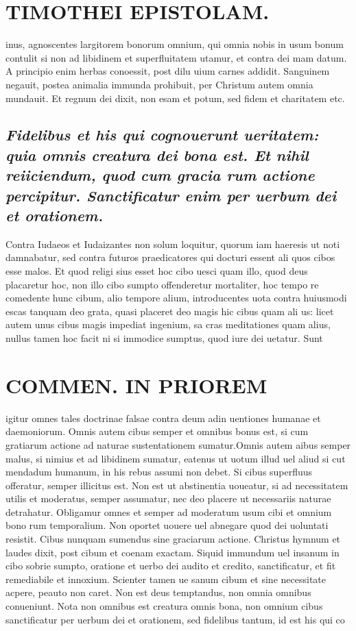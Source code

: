 \documentclass{article}
\begin{document}
\begin{pages}
\section*{TIMOTHEI EPISTOLAM. }
\marginpar{[ p.99 ]}\pstart inus, agnoscentes largitorem bonorum omnium, qui omnia nobis in usum bonum contulit si non ad libidinem et superfluitatem utamur, et contra dei mam datum. A principio enim herbas conoessit, post dilu uium carnes addidit. Sanguinem negauit, postea animalia immunda prohibuit, per Christum autem omnia mundauit. Et regnum dei dixit, non esam et potum, sed fidem et charitatem etc.  \pend
{}
{}
\subsection*{\textit{Fidelibus et his qui cognouerunt ueritatem: quia omnis creatura dei bona est. Et nihil reiiciendum, quod cum gracia rum actione percipitur. Sanctificatur enim per uerbum dei et orationem. }}\pstart Contra Iudaeos et Iudaizantes non solum loquitur, quorum iam haeresis ut noti damnabatur, sed contra futuros praedicatores qui docturi essent ali quos cibos esse malos. Et quod religi sius esset hoc cibo uesci quam illo, quod deus placaretur hoc, non illo cibo sumpto offenderetur mortaliter, hoc tempo re comedente hunc cibum, alio tempore alium, introducentes uota contra huiusmodi escas tanquam deo grata, quasi placeret deo magis hic cibus quam ali us: licet autem unus cibus magis impediat ingenium, sa cras meditationes quam alius, nullus tamen hoc facit ni si immodice sumptus, quod iure dei uetatur. Sunt  \pend
\section*{COMMEN. IN PRIOREM }
\marginpar{[ p.100 ]}\pstart igitur omnes tales doctrinae falsae contra deum adin uentiones humanae et daemoniorum. Omnis autem cibus semper et omnibus bonus est, si cum gratiarum actione ad naturae sustentationem sumatur.Omnis autem aibus semper malus, si nimius et ad libidinem sumatur, eatenus ut uotum illud uel aliud si cut mendadum humanum, in his rebus assumi non debet. Si cibus superfluus offeratur, semper illicitus est. Non est ut abstinentia uoueatur, si ad necessitatem utilis et moderatus, semper assumatur, nec deo placere ut necessariis naturae detrahatur. Obligamur omnes et semper ad moderatum usum cibi et omnium bono rum temporalium. Non oportet uouere uel abnegare quod dei uoluntati resistit. Cibus nunquam sumendus sine graciarum actione. Christus hymnum et laudes dixit, post cibum et coenam exactam. Siquid immundum uel insanum in cibo sobrie sumpto, oratione et uerbo dei audito et credito, sanctificatur, et fit remediabile et innoxium. Scienter tamen ue sanum cibum et sine necessitate acpere, peauto non caret. Non est deus temptandus, non omnia omnibus conueniunt.  \pend\pstart Nota non omnibus est creatura omnis bona, non omnium cibus sanctificatur per uerbum dei et orationem, sed fidelibus tantum, id est his qui co  \pend

\end{pages}
\end{document}
